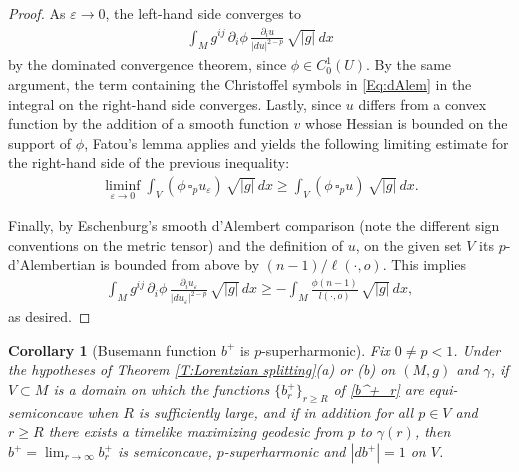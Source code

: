 \documentclass[12pt]{amsart}
\newcommand{\re}{\color{red}}
\newtheorem{corollary}[theorem]{Corollary}
\begin{document}
\begin{proof}
As $\varepsilon \to 0$, the left-hand side converges to
\begin{align*}
    \int_M g^{ij}\,\partial_i\phi\,\frac{\partial_i u}{\vert du\vert^{2-p}}\,\sqrt{\vert g\vert}\,d x 
\end{align*}
by the dominated convergence theorem, since $\phi \in C^1_0(U).$ 
By the same argument, the term containing the Christoffel symbols in \eqref{Eq:dAlem} in the integral on the right-hand side converges. Lastly, since $u$ differs from a convex function by the addition of a smooth function $v$ whose Hessian is bounded on the support of $\phi$, Fatou's lemma applies and yields the following limiting estimate for the right-hand side of the previous inequality:
\begin{align*}
\liminf_{\varepsilon \to 0} \int_V (\phi\,\square_pu_\varepsilon)\,\sqrt{\vert g\vert}\,dx \geq\int_V(\phi\,\square_pu)\,\sqrt{\vert g\vert}\,dx.
\end{align*}

Finally, by Eschenburg's smooth d'Alembert comparison \cite[§5]{Eschenburg88} (note the different sign conventions on the metric tensor) and the definition of $u$, on the given set $V$ its $p$-d'Alembertian is bounded from above by $(n-1)/\ell(\cdot,o)$. This implies
\begin{align*}
 \int_M g^{ij}\,\partial_i\phi\,\frac{\partial_i u_\varepsilon}{\vert du_\varepsilon\vert^{2-p}}\,\sqrt{\vert g\vert}\,d x  \geq -\int_M \frac{\phi(n-1)}{l(\cdot,o)}\,\sqrt{\vert g\vert}\,dx,
\end{align*}
as desired.
\end{proof}

\begin{corollary}[Busemann function $b^+$ is $p$-superharmonic]
\label{L:harmonicity}
Fix $0 \ne p<1$. 
Under the hypotheses of Theorem \ref{T:Lorentzian splitting}(a) or (b) on $(M,g)$ and $\gamma$,
if $V \subset M$ is a domain on which the functions $\{b^+_r\}_{r \ge R}$ of \eqref{b^+_r} are equi-semiconcave when $R$ is sufficiently large, and if in addition %
for all $p \in V$ and $r \ge R$ there exists a timelike maximizing geodesic from $p$ to $\gamma(r)$,
then $b^+ = \lim_{r\to \infty} b^+_r$ 
is semiconcave, $p$-superharmonic and $|db^+|=1$ on $V$.
\end{corollary}
\end{document}
